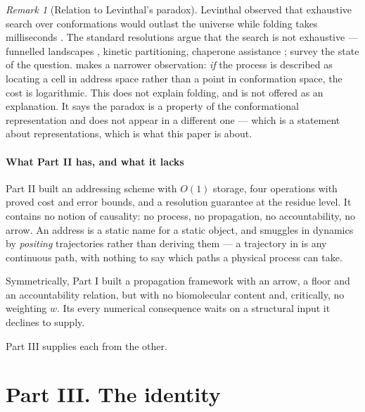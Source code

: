\documentclass[11pt,twocolumn,a4paper]{article}
\theoremstyle{thmstyle}
\theoremstyle{definition}
\theoremstyle{remark}
\newtheorem{remark}[theorem]{Remark}
\newcommand{\wt}{w}
\begin{document}
\begin{remark}[Relation to Levinthal's paradox]
\label{rem:levinthal}
Levinthal observed that exhaustive search over conformations would
outlast the universe while folding takes milliseconds
\citep{levinthal1968,levinthal1969}. The standard resolutions argue
that the search is not exhaustive --- funnelled landscapes
\citep{bryngelson1995,zwanzig1992}, kinetic partitioning, chaperone
assistance \citep{hartl2002}; \citet{dill2012} survey the state of the
question.  makes a narrower observation: \emph{if}
the process is described as locating a cell in address space rather
than a point in conformation space, the cost is logarithmic. This does
not explain folding, and is not offered as an explanation. It says the
paradox is a property of the conformational representation and does not
appear in a different one --- which is a statement about
representations, which is what this paper is about.
\end{remark}

\subsection{What Part II has, and what it lacks}

Part II built an addressing scheme with $O(1)$ storage, four
operations with proved cost and error bounds, and a resolution
guarantee at the residue level. It contains no notion of causality: no
process, no propagation, no accountability, no arrow. An address is a
static name for a static object, and  smuggles in
dynamics by \emph{positing} trajectories rather than deriving them ---
a trajectory in  is any continuous path, with
nothing to say which paths a physical process can take.

Symmetrically, Part I built a propagation framework with an arrow, a
floor and an accountability relation, but with no biomolecular content
and, critically, no weighting $\wt$. Its every numerical consequence
waits on a structural input it declines to supply.

Part III supplies each from the other.

\part*{Part III. The identity}
\end{document}
